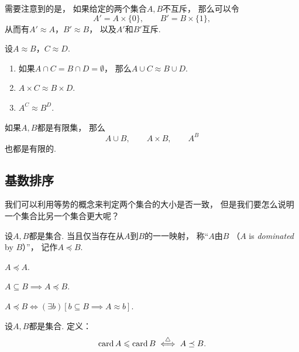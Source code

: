 需要注意到的是，
如果给定的两个集合\(A,B\)不互斥，
那么可以令\[
	A' = A\times\{0\}, \qquad
	B' = B\times\{1\},
\]
从而有\(A' \approx A\)，\(B' \approx B\)，
以及\(A'\)和\(B'\)互斥.

\begin{theorem}
设\(A \approx B\)，\(C \approx D\).
\begin{enumerate}
	\item 如果\(A \cap C = B \cap D = \emptyset\)，
	那么\(A \cup C \approx B \cup D\).
	\item \(A \times C \approx B \times D\).
	\item \(A^C \approx B^D\).
\end{enumerate}
\end{theorem}

\begin{theorem}
如果\(A,B\)都是有限集，
那么\[
	A \cup B, \qquad
	A \times B, \qquad
	A^B
\]也都是有限的.
\end{theorem}

\subsection{基数排序}
我们可以利用等势的概念来判定两个集合的大小是否一致，
但是我们要怎么说明一个集合比另一个集合更大呢？

\begin{definition}
设\(A,B\)都是集合.
当且仅当存在从\(A\)到\(B\)的一一映射，
称“\(A\)由\(B\) （\(A\) is \emph{dominated} by \(B\)）”，
记作\(A \preceq B\).
\end{definition}

\begin{example}
\(A \preceq A\).
\end{example}

\begin{example}
\(A \subseteq B \implies A \preceq B\).
\end{example}

\begin{theorem}
\(A \preceq B
\iff
(\exists b)[b \subseteq B \implies A \approx b]\).
\end{theorem}

\begin{definition}
设\(A,B\)都是集合.
定义：\begin{equation}
	\operatorname{card} A \leqslant \operatorname{card} B \overset{\triangle}{\iff} A \preceq B.
\end{equation}
\end{definition}

